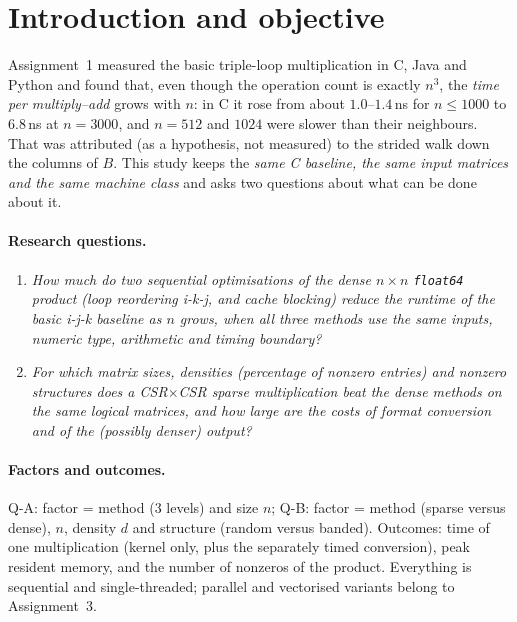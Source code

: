 \section{Introduction and objective}

Assignment~1 \cite{a1} measured the basic triple-loop multiplication in C, Java and Python and found that, even though the
operation count is exactly $n^3$, the \emph{time per multiply--add} grows with $n$: in C it rose from about $1.0$--$1.4$\,ns for
$n\le1000$ to $6.8$\,ns at $n=3000$, and $n=512$ and $1024$ were slower than their neighbours. That was attributed (as a hypothesis, not
measured) to the strided walk down the columns of $B$. This study keeps the \emph{same C baseline, the same input matrices and the same
machine class} and asks two questions about what can be done about it.

\paragraph{Research questions.}
\begin{enumerate}
  \item[\textbf{Q-A}] \emph{How much do two sequential optimisations of the dense $n\times n$ \texttt{float64} product (loop reordering
        i-k-j, and cache blocking) reduce the runtime of the basic i-j-k baseline as $n$ grows, when all three methods use the same inputs,
        numeric type, arithmetic and timing boundary?}
  \item[\textbf{Q-B}] \emph{For which matrix sizes, densities (percentage of nonzero entries) and nonzero structures does a
        CSR$\times$CSR sparse multiplication beat the dense methods on the same logical matrices, and how large are the costs of format
        conversion and of the (possibly denser) output?}
\end{enumerate}

\paragraph{Factors and outcomes.} Q-A: factor = method (3 levels) and size $n$; Q-B: factor = method (sparse versus dense), $n$, density $d$ and
structure (random versus banded). Outcomes: time of one multiplication (kernel only, plus the separately timed conversion), peak resident
memory, and the number of nonzeros of the product. Everything is sequential and single-threaded; parallel and vectorised variants belong to
Assignment~3.


